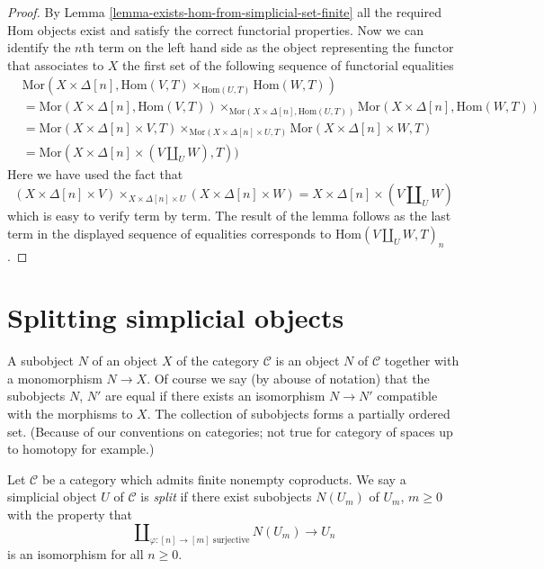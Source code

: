 \begin{proof}
By Lemma \ref{lemma-exists-hom-from-simplicial-set-finite}
all the required $\text{Hom}$ objects exist and satisfy the
correct functorial properties. Now we can identify
the $n$th term on the left hand side as the object
representing the functor that associates to $X$
the first set of the following sequence of functorial
equalities
\begin{align*}
&
\text{Mor}(X \times \Delta[n],
\text{Hom}(V, T) \times_{\text{Hom}(U, T)} \text{Hom}(W, T)) \\
& =
\text{Mor}(X \times \Delta[n], \text{Hom}(V, T))
\times_{\text{Mor}(X \times \Delta[n], \text{Hom}(U, T))}
\text{Mor}(X \times \Delta[n], \text{Hom}(W, T)) \\
& =
\text{Mor}(X \times \Delta[n] \times V, T)
\times_{\text{Mor}(X \times \Delta[n] \times U, T)}
\text{Mor}(X \times \Delta[n] \times W, T) \\
& =
\text{Mor}(X \times \Delta[n] \times (V \amalg_U W), T))
\end{align*}
Here we have used the fact that
$$
(X \times \Delta[n] \times V)
\times_{X \times \Delta[n] \times U}
(X \times \Delta[n] \times W)
=
X \times \Delta[n] \times (V \amalg_U W)
$$
which is easy to verify term by term. The result of the lemma
follows as the last term in the displayed sequence of
equalities corresponds to $\text{Hom}(V \amalg_U W, T)_n$.
\end{proof}













\section{Splitting simplicial objects}
\label{section-splitting}

\noindent
A subobject $N$ of an object $X$ of the category $\mathcal{C}$
is an object $N$ of $\mathcal{C}$ together with a monomorphism
$N \to X$. Of course we say (by abouse of notation) that
the subobjects $N$, $N'$ are equal if there exists an isomorphism
$N \to N'$ compatible with the morphisms to $X$. The collection
of subobjects forms a partially ordered set. (Because of our
conventions on categories; not true for category of spaces
up to homotopy for example.)

\begin{definition}
\label{definition-split}
Let $\mathcal{C}$ be a category which admits finite nonempty coproducts.
We say a simplicial object $U$ of $\mathcal{C}$ is {\it split}
if there exist subobjects $N(U_m)$ of $U_m$, $m \geq 0$
with the property that
\begin{equation}
\label{equation-splitting}
\coprod\nolimits_{\varphi : [n] \to [m]\text{ surjective}}
N(U_m)
\longrightarrow
U_n
\end{equation}
is an isomorphism for all $n \geq 0$.
\end{definition}

